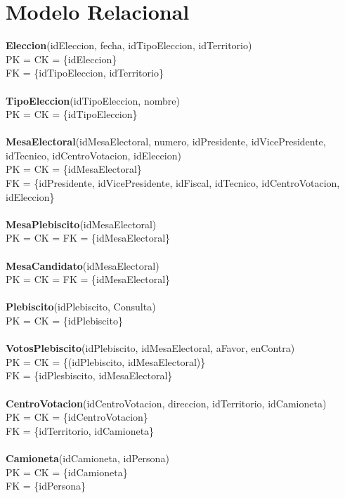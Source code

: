 \section{Modelo Relacional}

\textbf{Eleccion}(idEleccion, fecha, idTipoEleccion, idTerritorio)\\
  PK = CK = \{idEleccion\}\\
  FK = \{idTipoEleccion, idTerritorio\}\\
\\
\textbf{TipoEleccion}(idTipoEleccion, nombre)\\
  PK = CK = \{idTipoEleccion\}\\
\\
\textbf{MesaElectoral}(idMesaElectoral, numero, idPresidente, idVicePresidente, idTecnico, idCentroVotacion, idEleccion)\\
  PK = CK = \{idMesaElectoral\}\\
  FK = \{idPresidente, idVicePresidente, idFiscal, idTecnico, idCentroVotacion, idEleccion\}\\
\\
\textbf{MesaPlebiscito}(idMesaElectoral)\\
  PK = CK = FK = \{idMesaElectoral\}\\
\\
\textbf{MesaCandidato}(idMesaElectoral)\\
  PK = CK = FK = \{idMesaElectoral\}\\
\\
\textbf{Plebiscito}(idPlebiscito, Consulta)\\
  PK = CK = \{idPlebiscito\}\\
\\
\textbf{VotosPlebiscito}(idPlebiscito, idMesaElectoral, aFavor, enContra)\\
  PK = CK = \{(idPlebiscito, idMesaElectoral)\}\\
  FK = \{idPlesbiscito, idMesaElectoral\}\\
\\
\textbf{CentroVotacion}(idCentroVotacion, direccion, idTerritorio, idCamioneta)\\
  PK = CK = \{idCentroVotacion\}\\
  FK = \{idTerritorio, idCamioneta\}\\
\\
\textbf{Camioneta}(idCamioneta, idPersona)\\
  PK = CK = \{idCamioneta\}\\
  FK = \{idPersona\}\\
